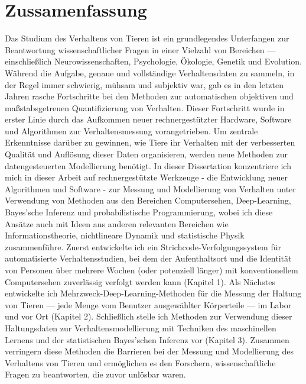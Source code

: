 	\chapter*{Zussamenfassung}
  Das Studium des Verhaltens von Tieren ist ein grundlegendes Unterfangen zur Beantwortung wissenschaftlicher Fragen in einer Vielzahl von Bereichen --- einschließlich Neurowissenschaften, Psychologie, Ökologie, Genetik und Evolution. Während die Aufgabe, genaue und vollständige Verhaltensdaten zu sammeln, in der Regel immer schwierig, mühsam und subjektiv war, gab es in den letzten Jahren rasche Fortschritte bei den Methoden zur automatischen objektiven und maßstabsgetreuen Quantifizierung von Verhalten. Dieser Fortschritt wurde in erster Linie durch das Aufkommen neuer rechnergestützter Hardware, Software und Algorithmen zur Verhaltensmessung vorangetrieben. Um zentrale Erkenntnisse darüber zu gewinnen, wie Tiere ihr Verhalten mit der verbesserten Qualität und Auflösung dieser Daten organisieren, werden neue Methoden zur datengesteuerten Modellierung benötigt. In dieser Dissertation konzentriere ich mich in dieser Arbeit auf rechnergestützte Werkzeuge - die Entwicklung neuer Algorithmen und Software - zur Messung und Modellierung von Verhalten unter Verwendung von Methoden aus den Bereichen Computersehen, Deep-Learning, Bayes'sche Inferenz und probabilistische Programmierung, wobei ich diese Ansätze auch mit Ideen aus anderen relevanten Bereichen wie Informationstheorie, nichtlineare Dynamik und statistische Physik zusammenführe. Zuerst entwickelte ich ein Strichcode-Verfolgungssystem für automatisierte Verhaltensstudien, bei dem der Aufenthaltsort und die Identität von Personen über mehrere Wochen (oder potenziell länger) mit konventionellem Computersehen zuverlässig verfolgt werden kann (Kapitel 1). Als Nächstes entwickelte ich Mehrzweck-Deep-Learning-Methoden für die Messung der Haltung von Tieren --- jede Menge vom Benutzer ausgewählter Körperteile --- im Labor und vor Ort (Kapitel 2). Schließlich stelle ich Methoden zur Verwendung dieser Haltungsdaten zur Verhaltensmodellierung mit Techniken des maschinellen Lernens und der statistischen Bayes'schen Inferenz vor (Kapitel 3). Zusammen verringern diese Methoden die Barrieren bei der Messung und Modellierung des Verhaltens von Tieren und ermöglichen es den Forschern, wissenschaftliche Fragen zu beantworten, die zuvor unlösbar waren.


